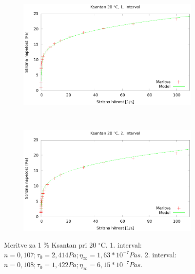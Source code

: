 \documentclass{article}
\begin{document}
\begin{figure}[H]
	\centering
	\begin{subfigure}[b]{0.45\textwidth}
	       \includegraphics[width=\textwidth]{tok_ksan1.eps}
	   \end{subfigure}
	   ~
	   \begin{subfigure}[b]{0.45\textwidth}
	       \includegraphics[width=\textwidth]{tok_ksan2.eps}
	   \end{subfigure}
	\caption{Meritve za 1 \% Ksantan pri 20 $^\circ$C. 1. interval: $n = 0,107; \tau_0 = 2,414 Pa; \eta_\infty = 1,63*10^{-7} Pa s$. 2. interval: $n = 0,108; \tau_0 = 1,422 Pa; \eta_\infty = 6,15*10^{-7} Pa s$.}
	\label{fig:tok_ksan1}
\end{figure}
\end{document}
